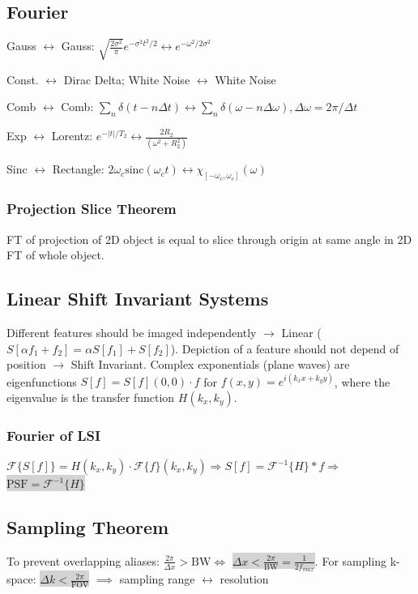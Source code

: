 \documentclass[9pt]{article}
\newcommand{\grey}[1]{\setlength{\fboxsep}{0pt}\colorbox{lightgrey}{#1}}
\newcommand{\fcal}{\mathcal{F}}
\begin{document}
\begin{multicols}{2}
\subsection{Fourier}
\vspace{-2mm}
Gauss $\leftrightarrow$ Gauss: $\sqrt{\frac{2\sigma^2}{\pi}} e^{-\sigma^2t^2/2} \leftrightarrow e^{-\omega^2/2\sigma^2}$

Const. $\leftrightarrow$ Dirac Delta; White Noise $\leftrightarrow$ White Noise

Comb $\leftrightarrow$ Comb: $\sum_n \delta(t - n\Delta t) \leftrightarrow \sum_n \delta(\omega - n \Delta \omega), \Delta\omega = 2\pi/\Delta t$

Exp $\leftrightarrow$ Lorentz: $e^{-|t|/T_2} \leftrightarrow \frac{2R_2}{(\omega^2 + R_2^2)}$

Sinc $\leftrightarrow$ Rectangle: $2\omega_c \mathrm{sinc}(\omega_c t) \leftrightarrow \chi_{[-\omega_c, \omega_c]}(\omega)$

\subsubsection{Projection Slice Theorem} FT of projection of 2D object is equal to slice through origin at same angle in 2D FT of whole object.

\subsection{Linear Shift Invariant Systems}
Different features should be imaged independently $\rightarrow$ Linear ($S[\alpha f_1 + f_2] = \alpha S[f_1] + S[f_2]$). Depiction of a feature should not depend of position $\rightarrow$ Shift Invariant. Complex exponentials (plane waves) are eigenfunctions $S[f] = S[f](0,0) \cdot f$ for $f(x,y) = e^{i(k_xx + k_yy)}$, where the eigenvalue is the transfer function $H(k_x,k_y)$.
\subsubsection{Fourier of LSI}
$\fcal\{S[f]\} = H(k_x,k_y) \cdot \fcal\{f\}(k_x,k_y) \Rightarrow S[f] = \fcal^{-1}\{H\} \ast f \Rightarrow $ \grey{$\mathrm{PSF} = \fcal^{-1}\{H\}$}

\subsection{Sampling Theorem}
\vspace{-1mm}
To prevent overlapping aliases: $\frac{2\pi}{\Delta x} > \mathrm{BW} \Leftrightarrow$ \grey{$\Delta x < \frac{2\pi}{\mathrm{BW}}= \frac{1}{2f_{max}}$}. For sampling k-space: \grey{$\Delta k < \frac{2\pi}{\mathrm{FOV}}$}
$\implies$ sampling range $\leftrightarrow$ resolution \\
\vspace{-5mm}

\end{multicols}
\end{document}
